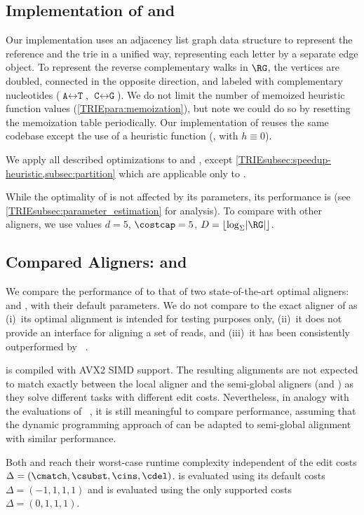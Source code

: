 \subsection{Implementation of \astarix and \dijkstra}
Our \astarix implementation uses an adjacency list graph data structure to
represent the reference and the trie in a unified way, representing each letter
by a separate edge object.
To represent the reverse complementary walks in $\RG$, the vertices are doubled,
connected in the opposite direction, and labeled with complementary nucleotides
($\texttt{A} \leftrightarrow \texttt{T}$, $\texttt{C} \leftrightarrow
\texttt{G}$).
%
We do not limit the number of memoized heuristic function values
(\cref{TRIEpara:memoization}), but note we could do so by resetting the memoization
table periodically.
%
Our implementation of \dijkstra reuses the same \astarix codebase except the
use of a heuristic function (\ie, with $h \equiv 0$).

We apply all described optimizations to \astarix and \dijkstra, except
\cref{TRIEsubsec:speedup-heuristic,subsec:partition} which are applicable only to
\astarix.

While the optimality of \astarix is not affected by its parameters, its
performance is (see \cref{TRIEsubsec:parameter_estimation} for analysis). To compare
with other aligners, we use values \mbox{$d=5$}, \mbox{$\costcap=5$}, \mbox{$D =
\lfloor \log_\Sigma \lvert \RG \rvert \rfloor$}.

\subsection{Compared Aligners: \pasgal and \bitparallel}

We compare the performance of \astarix to that of two state-of-the-art optimal
aligners: \pasgal and \bitparallel, with their default parameters.
%
We do not compare to the exact aligner of \vg as (i)~its optimal alignment
is intended for testing purposes only, (ii)~it does not provide an
interface for aligning a set of reads, and (iii)~it has been consistently
outperformed by \pasgal~\cite{jain_accelerating_2019}.

\pasgal is compiled with AVX2 SIMD support. The resulting alignments are not
expected to match exactly between the local aligner \pasgal and the semi-global
aligners (\astarix and \bitparallel) as they solve different tasks with
different edit costs. Nevertheless, in analogy with the evaluations of
\pasgal~\cite{jain_accelerating_2019}, it is still meaningful to compare
performance, assuming that the dynamic programming approach of \pasgal can be
adapted to semi-global alignment with similar performance.

Both \bitparallel and \pasgal reach their worst-case runtime complexity
independent of the edit costs $\Delta=(\cmatch,\csubst,\cins,\cdel)$. \pasgal is
evaluated using its default costs ~$\Delta=(-1,1,1,1)$ and \bitparallel is
evaluated using the only supported costs~$\Delta=(0,1,1,1)$.
